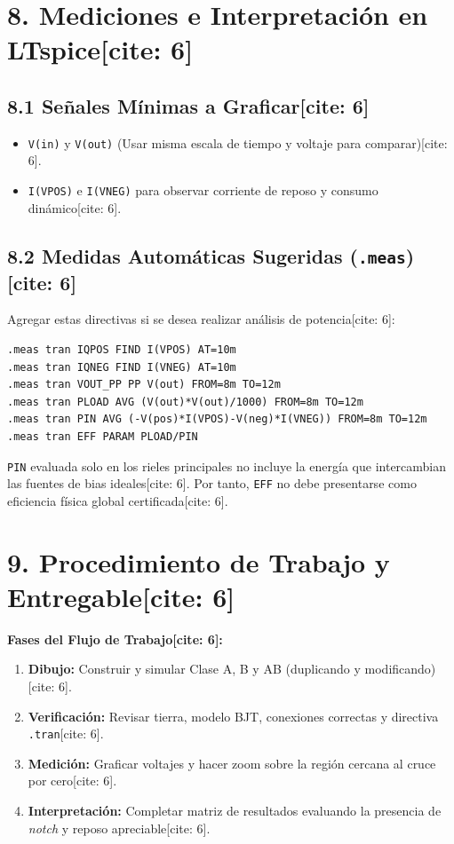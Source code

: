 \documentclass[11pt, a4paper]{article}
\begin{document}
\newpage

\section*{8. Mediciones e Interpretación en LTspice[cite: 6]}
\subsection*{8.1 Señales Mínimas a Graficar[cite: 6]}
\begin{itemize}
    \item \texttt{V(in)} y \texttt{V(out)} (Usar misma escala de tiempo y voltaje para comparar)[cite: 6].
    \item \texttt{I(VPOS)} e \texttt{I(VNEG)} para observar corriente de reposo y consumo dinámico[cite: 6].
\end{itemize}

\subsection*{8.2 Medidas Automáticas Sugeridas (\texttt{.meas})[cite: 6]}
Agregar estas directivas si se desea realizar análisis de potencia[cite: 6]:
\begin{lstlisting}[style=spice]
.meas tran IQPOS FIND I(VPOS) AT=10m
.meas tran IQNEG FIND I(VNEG) AT=10m
.meas tran VOUT_PP PP V(out) FROM=8m TO=12m
.meas tran PLOAD AVG (V(out)*V(out)/1000) FROM=8m TO=12m
.meas tran PIN AVG (-V(pos)*I(VPOS)-V(neg)*I(VNEG)) FROM=8m TO=12m
.meas tran EFF PARAM PLOAD/PIN
\end{lstlisting}

\begin{tcolorbox}[colback=red!5, colframe=red!70!black, title=\textbf{Limitaciones de la Medición de Eficiencia {[cite: 6]}}]
    \texttt{PIN} evaluada solo en los rieles principales no incluye la energía que intercambian las fuentes de bias ideales[cite: 6]. Por tanto, \texttt{EFF} no debe presentarse como eficiencia física global certificada[cite: 6].
\end{tcolorbox}

\section*{9. Procedimiento de Trabajo y Entregable[cite: 6]}
\textbf{Fases del Flujo de Trabajo[cite: 6]:}
\begin{enumerate}
    \item \textbf{Dibujo:} Construir y simular Clase A, B y AB (duplicando y modificando)[cite: 6].
    \item \textbf{Verificación:} Revisar tierra, modelo BJT, conexiones correctas y directiva \texttt{.tran}[cite: 6].
    \item \textbf{Medición:} Graficar voltajes y hacer zoom sobre la región cercana al cruce por cero[cite: 6].
    \item \textbf{Interpretación:} Completar matriz de resultados evaluando la presencia de \textit{notch} y reposo apreciable[cite: 6].
\end{enumerate}
\end{document}
